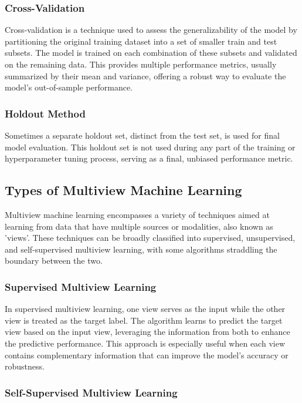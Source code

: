 \subsubsection{Cross-Validation}

Cross-validation is a technique used to assess the generalizability of the model by partitioning the original training dataset into a set of smaller train and test subsets. The model is trained on each combination of these subsets and validated on the remaining data. This provides multiple performance metrics, usually summarized by their mean and variance, offering a robust way to evaluate the model's out-of-sample performance.

\subsubsection{Holdout Method}

Sometimes a separate holdout set, distinct from the test set, is used for final model evaluation. This holdout set is not used during any part of the training or hyperparameter tuning process, serving as a final, unbiased performance metric.

\subsection{Types of Multiview Machine Learning}

Multiview machine learning encompasses a variety of techniques aimed at learning from data that have multiple sources or modalities, also known as 'views'. These techniques can be broadly classified into supervised, unsupervised, and self-supervised multiview learning, with some algorithms straddling the boundary between the two. 

\subsubsection{Supervised Multiview Learning}

In supervised multiview learning, one view serves as the input while the other view is treated as the target label. The algorithm learns to predict the target view based on the input view, leveraging the information from both to enhance the predictive performance. This approach is especially useful when each view contains complementary information that can improve the model's accuracy or robustness.

\subsubsection{Self-Supervised Multiview Learning}

